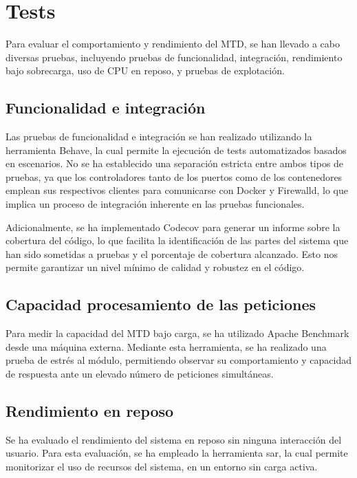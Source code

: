 \section{Tests}
Para evaluar el comportamiento y rendimiento del MTD, se han llevado a cabo diversas pruebas, incluyendo pruebas de funcionalidad, integración, rendimiento bajo sobrecarga, uso de CPU en reposo, y pruebas de explotación.


\subsection{Funcionalidad e integración}
Las pruebas de funcionalidad e integración se han realizado utilizando la herramienta Behave, la cual permite la ejecución de tests automatizados basados en escenarios. No se ha establecido una separación estricta entre ambos tipos de pruebas, ya que los controladores tanto de los puertos como de los contenedores emplean sus respectivos clientes para comunicarse con Docker y Firewalld, lo que implica un proceso de integración inherente en las pruebas funcionales.

Adicionalmente, se ha implementado Codecov para generar un informe sobre la cobertura del código, lo que facilita la identificación de las partes del sistema que han sido sometidas a pruebas y el porcentaje de cobertura alcanzado. Esto nos permite garantizar un nivel mínimo de calidad y robustez en el código.

\subsection{Capacidad procesamiento de las peticiones}
Para medir la capacidad del MTD bajo carga, se ha utilizado Apache Benchmark desde una máquina externa. Mediante esta herramienta, se ha realizado una prueba de estrés al módulo, permitiendo observar su comportamiento y capacidad de respuesta ante un elevado número de peticiones simultáneas.


\subsection{Rendimiento en reposo}
Se ha evaluado el rendimiento del sistema en reposo sin ninguna interacción del usuario. Para esta evaluación, se ha empleado la herramienta sar\cite{sar}, la cual permite monitorizar el uso de recursos del sistema, en un entorno sin carga activa.


